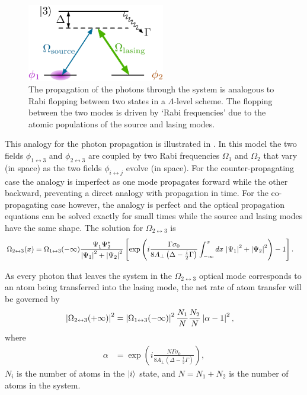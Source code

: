 \begin{figure}
    \centering
    \includegraphics[width=6cm]{DualModel}
    \caption{The propagation of the photons through the system is analogous to Rabi flopping between two states in a $\Lambda$-level scheme.  The flopping between the two modes is driven by `Rabi frequencies' due to the atomic populations of the source and lasing modes.}
    \label{OpticalPumping:DualModel}
\end{figure}

This analogy for the photon propagation is illustrated in .  In this model the two fields $\phi_{1\leftrightarrow 3}$ and $\phi_{2 \leftrightarrow 3}$ are coupled by two Rabi frequencies $\Omega_1$ and $\Omega_2$ that vary (in space) as the two fields $\phi_{i \leftrightarrow j}$ evolve (in space).  For the counter-propagating case the analogy is imperfect as one mode propagates forward while the other backward, preventing a direct analogy with propagation in time.  For the co-propagating case however, the analogy is perfect and the optical propagation equations can be solved exactly for small times while the source and lasing modes have the same shape.  The solution for $\Omega_{2\leftrightarrow 3}$ is
\begin{align}
    \Omega_{2\leftrightarrow 3}(x) &= \Omega_{1\leftrightarrow 3}(-\infty) \frac{\Psi_1^{\phantom{*}} \Psi_2^*}{\left|\Psi_1\right|^2 + \left|\Psi_2\right|^2} \left[\exp \left( i \frac{\Gamma \sigma_0}{8 A_\perp\left(\Delta - \frac{i}{2} \Gamma\right)}\int_{-\infty}^x dx\, \left|\Psi_1\right|^2 + \left|\Psi_2\right|^2\right) -1 \right].
\end{align}

As every photon that leaves the system in the $\Omega_{2\leftrightarrow 3}$ optical mode corresponds to an atom being transferred into the lasing mode, the net rate of atom transfer will be governed by
\begin{align}
    \abs{\Omega_{2\leftrightarrow 3}(+\infty)}^2 &= \abs{\Omega_{1\leftrightarrow 3}(-\infty)}^2 \frac{N_1}{N} \frac{N_2}{N} \abs{\alpha - 1}^2, \label{OpticalPumping:OverlappingCondensates:Omega2Infinity}
\end{align}
where
\begin{align}
    \alpha &= \exp \left( i \frac{N\Gamma \sigma_0}{8 A_\perp\left(\Delta - \frac{i}{2} \Gamma\right)}\right),
\end{align}
$N_i$ is the number of atoms in the ${\left|i\right>}$ state, and $N = N_1 + N_2$ is the number of atoms in the system.  

